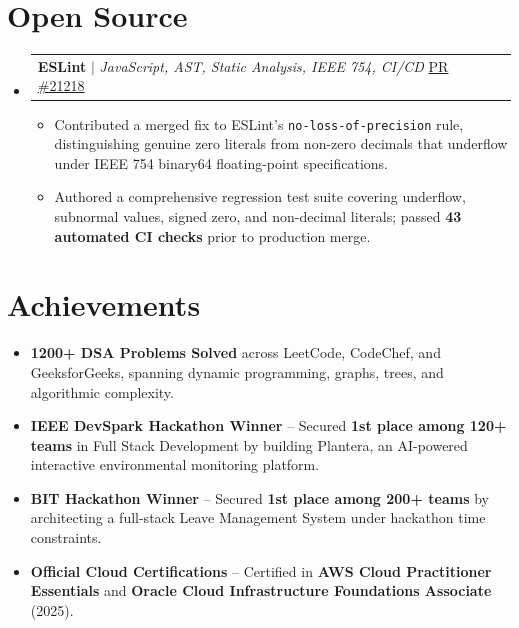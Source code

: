 \documentclass[letterpaper,10.5pt]{article}
\makeatletter
\newcommand{\resumeItem}[1]{
  \item\small{#1\vspace{-1pt}}
}
\newcommand{\resumeProjectHeading}[2]{
  \item
  \begin{tabular*}{0.97\textwidth}[t]{l@{\extracolsep{\fill}}r}
    \small#1 & #2 \\
  \end{tabular*}
  \vspace{1pt}
}
\newcommand{\resumeSubHeadingListStart}{
\begin{itemize}[
    leftmargin=0.15in,
    label={},
    itemsep=2pt,
    parsep=0pt,
    topsep=3pt,
    partopsep=0pt
]
}
\newcommand{\resumeSubHeadingListEnd}{
\end{itemize}
\vspace{-2pt}
}
\newcommand{\resumeItemListStart}{
\begin{itemize}[
    itemsep=1pt,
    parsep=0pt,
    topsep=1pt,
    partopsep=0pt,
    leftmargin=0.18in
]
}
\newcommand{\resumeItemListEnd}{
\end{itemize}
\vspace{-2pt}
}
\makeatother
\begin{document}
\section{Open Source}

\resumeSubHeadingListStart

\resumeProjectHeading
{\textbf{ESLint} $|$ \emph{JavaScript, AST, Static Analysis, IEEE 754, CI/CD}
\hfill
\href{https://github.com/eslint/eslint/pull/21218}{PR \#21218}}{}

\resumeItemListStart

    \resumeItem{Contributed a merged fix to ESLint's \texttt{no-loss-of-precision} rule, distinguishing genuine zero literals from non-zero decimals that underflow under IEEE 754 binary64 floating-point specifications.}

    \resumeItem{Authored a comprehensive regression test suite covering underflow, subnormal values, signed zero, and non-decimal literals; passed \textbf{43 automated CI checks} prior to production merge.}

\resumeItemListEnd

\resumeSubHeadingListEnd

\section{Achievements}

\resumeItemListStart

    \resumeItem{\textbf{1200+ DSA Problems Solved} across LeetCode, CodeChef, and GeeksforGeeks, spanning dynamic programming, graphs, trees, and algorithmic complexity.}

    \resumeItem{\textbf{IEEE DevSpark Hackathon Winner} -- Secured \textbf{1st place among 120+ teams} in Full Stack Development by building Plantera, an AI-powered interactive environmental monitoring platform.}

    \resumeItem{\textbf{BIT Hackathon Winner} -- Secured \textbf{1st place among 200+ teams} by architecting a full-stack Leave Management System under hackathon time constraints.}

    \resumeItem{\textbf{Official Cloud Certifications} -- Certified in \textbf{AWS Cloud Practitioner Essentials} and \textbf{Oracle Cloud Infrastructure Foundations Associate} (2025).}

\resumeItemListEnd

\end{document}
